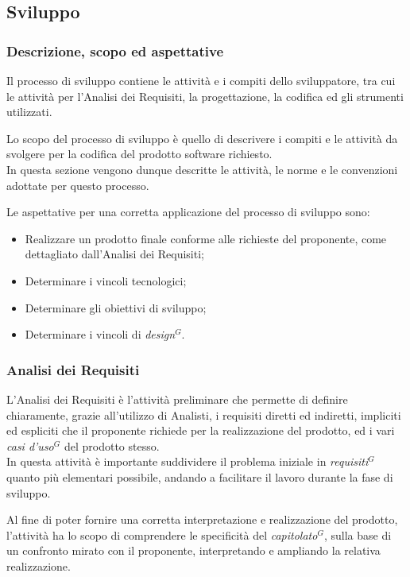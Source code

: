 \subsection{Sviluppo}

\subsubsection{Descrizione, scopo ed aspettative}

Il processo di sviluppo contiene le attività e i compiti dello sviluppatore, tra cui le attività per l’Analisi dei Requisiti, la progettazione, la codifica ed gli strumenti utilizzati.

Lo scopo del processo di sviluppo è quello di descrivere i compiti e le attività da svolgere per la codifica del prodotto software richiesto. \\
In questa sezione vengono dunque descritte le attività, le norme e le convenzioni adottate per questo processo.

Le aspettative per una corretta applicazione del processo di sviluppo sono:
\begin{itemize}
    \item Realizzare un prodotto finale conforme alle richieste del proponente, come dettagliato dall'Analisi dei Requisiti;
    \item Determinare i vincoli tecnologici;
    \item Determinare gli obiettivi di sviluppo;
    \item Determinare i vincoli di \emph{design}$^{G}$.
\end{itemize}
\subsubsection{Analisi dei Requisiti}


L’Analisi dei Requisiti è l’attività preliminare che permette di definire chiaramente, grazie all'utilizzo di Analisti, i requisiti diretti ed indiretti,
impliciti ed espliciti che il proponente richiede per la realizzazione del prodotto, ed i vari \emph{casi d’uso}$^{G}$ del prodotto stesso. \\
In questa attività è importante suddividere il problema iniziale in \emph{requisiti}$^{G}$ quanto più elementari possibile, andando a facilitare il lavoro durante la fase di sviluppo.

Al fine di poter fornire una corretta interpretazione e realizzazione del prodotto, l'attività ha lo scopo di comprendere le specificità del \emph{capitolato}$^{G}$, sulla base di un confronto mirato con il proponente, interpretando e ampliando la relativa realizzazione.
\pagebreak

